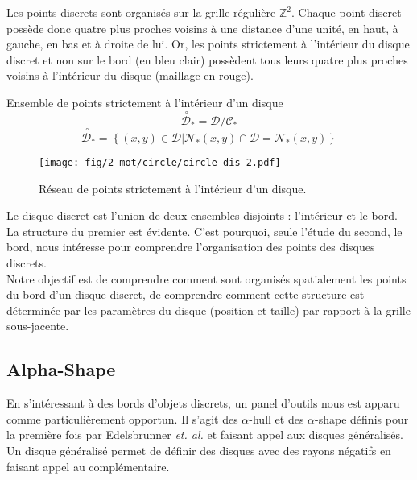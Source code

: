 Les points discrets sont organisés sur la grille régulière $\mathbb{Z}^{2}$. Chaque point discret possède donc quatre plus proches voisins à une distance d'une unité, en haut, à gauche, en bas et à droite de lui. Or, les points strictement à l'intérieur du disque discret et non sur le bord (en bleu clair) possèdent tous leurs quatre plus proches voisins à l'intérieur du disque (maillage en rouge).

\begin{Definition}{Ensemble de points strictement à l'intérieur d'un disque}
\label{def:int-ens}
  $$\stackrel{\ \circ}{\mathcal{D}}_{*} = \mathcal{D} / \mathcal{C_{*}} $$
  $$ \stackrel{\ \circ}{\mathcal{D}}_{*} =  \left\{ (x,y) \in \mathcal{D} | \mathcal{N}_{*}(x,y) \cap \mathcal{D} = \mathcal{N}_{*}(x,y) \right\}$$
\end{Definition}

\begin{figure}[H]
  \centering
  \texttt{[image: fig/2-mot/circle/circle-dis-2.pdf]}
  \caption{Réseau de points strictement à l'intérieur d'un disque.}
\end{figure}

Le disque discret est l'union de deux ensembles disjoints : l'intérieur et le bord. La structure du premier est évidente. C'est pourquoi, seule l'étude du second, le bord, nous intéresse pour comprendre l'organisation des points des disques discrets.\\

Notre objectif est de comprendre comment sont organisés spatialement les points du bord d'un disque discret, de comprendre comment cette structure est déterminée par les paramètres du disque (position et taille) par rapport à la grille sous-jacente.   

\subsection{Alpha-Shape}

En s'intéressant à des bords d'objets discrets, un panel d'outils nous est apparu comme particulièrement opportun. Il s'agit des $\alpha$-hull et des $\alpha$-shape définis pour la première fois par Edelsbrunner \emph{et. al.} \cite{EdeKirSei83} et faisant appel aux disques généralisés.\\

Un disque généralisé permet de définir des disques avec des rayons négatifs en faisant appel au complémentaire.

